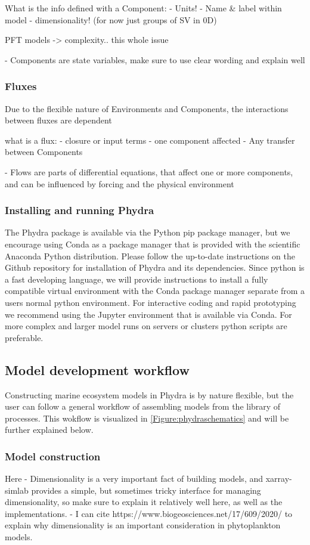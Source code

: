 \documentclass[template.tex]{subfiles}
\begin{document}
What is the info defined with a Component:
- Units!
- Name & label within model
- dimensionality! (for now just groups of SV in 0D)

PFT models -> complexity.. this whole issue

- Components are state variables, make sure to use clear wording and explain well

\subsubsection{Fluxes}
Due to the flexible nature of Environments and Components, the interactions between fluxes are dependent 

what is a flux:
- closure or input terms - one component affected
- Any transfer between Components

- Flows are parts of differential equations, that affect one or more components, and can be influenced by forcing and the physical environment


\subsubsection{Installing and running Phydra}
The Phydra package is available via the Python pip package manager, but we encourage using Conda as a package manager that is provided with the scientific Anaconda Python distribution.
Please follow the up-to-date instructions on the Github repository for installation of Phydra and its dependencies.
Since python is a fast developing language, we will provide instructions to install a fully compatible virtual environment with the Conda package manager separate from a users normal python environment. For interactive coding and rapid prototyping we recommend using the Jupyter environment that is available via Conda. For more complex and larger model runs on servers or clusters python scripts are preferable.

\subsection{Model development workflow}

Constructing marine ecosystem models in Phydra is by nature flexible, but the user can follow a general workflow of assembling models from the library of processes. This wokflow is visualized in \ref{Figure:phydraschematics} and will be further explained below.

\subsubsection{Model construction}
Here 
- Dimensionality is a very important fact of building models, and xarray-simlab provides a simple, but sometimes tricky interface for managing dimensionality, so make sure to explain it relatively well here, as well as the implementations.
- I can cite https://www.biogeosciences.net/17/609/2020/ to explain why dimensionality is an important consideration in phytoplankton models.
\end{document}

